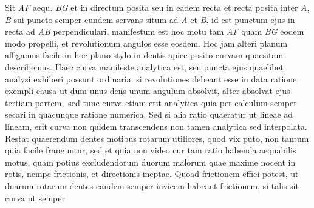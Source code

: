\pstart
Sit \textit{AF} aequ. \textit{BG} et in directum posita seu in eadem recta et recta 
posita inter \textit{A}, \textit{B}
sui puncto semper eundem servans situm ad \textit{A} et \textit{B}, id est
punctum ejus in recta ad \textit{AB} perpendiculari, manifestum est hoc motu tam \textit{AF} quam \textit{BG} eodem modo propelli, et revolutionum angulos esse eosdem. Hoc jam
alteri planum affigamus facile in hoc plano stylo in dentis apice posito curvam quaesitam describemus. Haec curva manifeste analytica est, seu puncta ejus quaelibet analysi exhiberi possunt ordinaria.
\pend
\pstart
{}
si revolutiones debeant esse in data ratione, exempli causa ut dum unus dens unum angulum absolvit, alter absolvat ejus tertiam partem\lbrack,\rbrack\
sed tunc curva etiam erit analytica quia per calculum semper
secari in quacunque ratione numerica.
Sed si alia ratio quaeratur ut lineae ad lineam, erit curva non quidem transcendens non tamen analytica sed interpolata.
\pend
\pstart
Restat quaerendum 
dentes motibus rotarum utiliores, quod vix puto, non tantum quia facile franguntur, sed et quia non video cur tam ratio habenda aequabilis motus, quam potius excludendorum duorum malorum quae maxime nocent in rotis,
nempe frictionis, et
directionis ineptae.
\pend
\pstart
Quoad frictionem effici potest, ut duarum rotarum dentes eandem semper invicem habeant frictionem, si talis sit curva
ut semper
